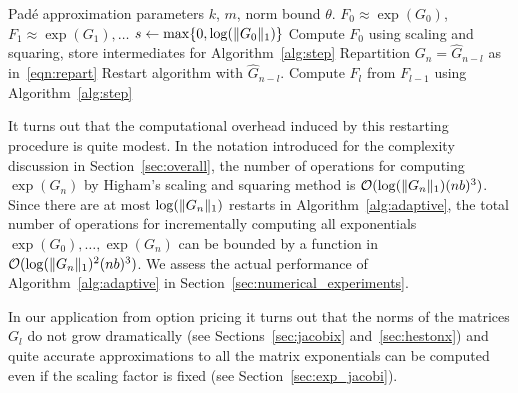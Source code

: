 \begin{algorithm}[t]
    \caption{Approximation of $\exp(G_0), \exp(G_1), \dotsc$ with
    adaptive scaling
    \label{alg:adaptive}}
    \begin{algorithmic}[1]
        \REQUIRE Pad\'e approximation parameters $k$, $m$, norm
        bound $\theta$.
        \ENSURE $F_0 \approx \exp(G_0)$, $F_1 \approx \exp(G_1), \dotsc$
        \STATE $s \leftarrow \max\{0, \log(\lVert G_0 \rVert_1)\}$
        \STATE Compute $F_0$ using scaling and squaring, store
            intermediates for Algorithm~\ref{alg:step}
                \STATE Repartition $G_n = \hat{G}_{n-l}$ as in~\eqref{eqn:repart}
                \STATE Restart algorithm with $\hat{G}_{n-l}$.
            \ENDIF
            \STATE Compute $F_{l}$ from $F_{l-1}$ using Algorithm~\ref{alg:step}
             \RETURN
            \ENDIF
        \ENDFOR
    \end{algorithmic}
\end{algorithm}

It turns out that the computational overhead induced by this
restarting procedure is quite modest.  In the notation introduced for
the complexity discussion in Section~\ref{sec:overall}, the number of
operations for computing $\exp(G_n)$ by Higham's scaling and squaring
method is ${\mathcal O}(\log(\lVert G_n \rVert_1) (nb)^3)$.  Since there are at
most $\log(\lVert G_n \rVert_1)$ restarts in Algorithm~\ref{alg:adaptive},
the total number of operations for incrementally computing all
exponentials $\exp(G_0), \dotsc, \exp(G_n)$ can be bounded by a
function in ${\mathcal O}(\log(\lVert G_n \rVert_1)^2 (nb)^3)$.  We assess the
actual performance of Algorithm~\ref{alg:adaptive} in
Section~\ref{sec:numerical_experiments}.

In our application from option pricing it turns out that the norms of
the matrices $G_l$ do not grow dramatically (see
Sections~\ref{sec:jacobix} and~\ref{sec:hestonx}) and quite accurate
approximations to all the matrix exponentials can be computed even if
the scaling factor is fixed (see Section~\ref{sec:exp_jacobi}).
